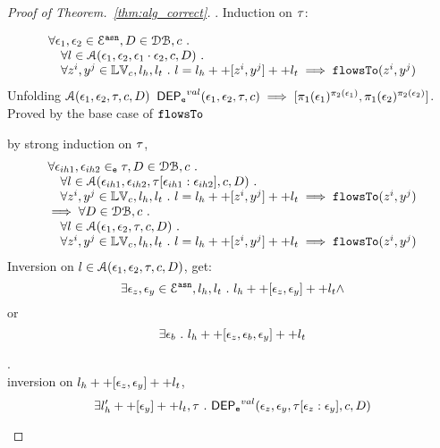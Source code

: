  \begin{proof}[Proof of Theorem.~\ref{thm:alg_correct}].
Induction on $\mathtt{\tau}$:
\begin{case}
[$\trace = \event_1 \cdot \event_2$]
\[
\begin{array}{l}
  \forall \mathtt{\epsilon}_1, \mathtt{\epsilon}_2 \in \mathcal{E}^{\mathtt{{asn}}}, D \in \mathcal{DB} , c ~.~
  \\ \quad 
   \forall l \in \mathcal{A}( \mathtt{\epsilon}_1, \mathtt{\epsilon}_2,  \mathtt{\epsilon}_1 \cdot \mathtt{\epsilon}_2, c, D) ~.~
   \\ \quad 
   \forall z^i, y^j \in \mathbb{LV}_c, l_h, l_t ~.~ 
   l = l_h ++ [z^i, y^j] ++ l_t 
   \implies \mathtt{flowsTo}(z^i, y^j)
\end{array}
\]
%
Unfolding $\mathcal{A}(\mathtt{\epsilon}_1, \mathtt{\epsilon}_2, \mathtt{\tau}, c, D)$
$\mathsf{DEP_{\mathtt{e}}}^{val}(\mathtt{\epsilon}_1, \mathtt{\epsilon}_2, \mathtt{\tau}, c) \implies [\pi_1(\mathtt{\epsilon}_1)^{\pi_2(\mathtt{\epsilon}_1)}, \pi_1(\mathtt{\epsilon}_2)^{\pi_2(\mathtt{\epsilon}_2)}]$.
\\
Proved by the base case of $\mathtt{flowsTo}$
\end{case}
%
\begin{case}
[$\trace = \event_1 \tracecat \trace_{ih} \cdot \event_2$]
by strong induction on $\mathtt{\tau}$,
\[
\begin{array}{l}
  \forall \mathtt{\epsilon}_{ih1}, \mathtt{\epsilon}_{ih2} \in_{\mathtt{e}} \mathtt{\tau}, D \in \mathcal{DB} , c ~.~
  \\ \quad 
   \forall l \in \mathcal{A}(\mathtt{\epsilon}_{ih1}, \mathtt{\epsilon}_{ih2}, \mathtt{\tau}[\mathtt{\epsilon}_{ih1}:\mathtt{\epsilon}_{ih2}], c, D) ~.~
   \\ \quad 
   \forall z^i, y^j \in \mathbb{LV}_c, l_h, l_t ~.~ 
   l = l_h ++ [z^i, y^j] ++ l_t 
   \implies \mathtt{flowsTo}(z^i, y^j)
   \\
   \implies
   \forall D \in \mathcal{DB} , c ~.~
  \\ \quad 
   \forall l \in \mathcal{A}(\mathtt{\epsilon}_1, \mathtt{\epsilon}_2, \mathtt{\tau}, c, D) ~.~
   \\ \quad 
   \forall z^i, y^j \in \mathbb{LV}_c, l_h, l_t ~.~ 
   l = l_h ++ [z^i, y^j] ++ l_t 
   \implies \mathtt{flowsTo}(z^i, y^j)  
\end{array}
\]
%
Inversion on $l \in \mathcal{A}(\mathtt{\epsilon}_1, \mathtt{\epsilon}_2, \mathtt{\tau}, c, D)$, get:
\[
  \exists \mathtt{\epsilon}_z, \mathtt{\epsilon}_y \in \mathcal{E}^{\mathtt{{asn}}}, l_h, l_t 
  ~.~ l_h ++ [\mathtt{\epsilon}_z, \mathtt{\epsilon}_y] ++ l_t \land 
\]
or
\[
    \exists \mathtt{\epsilon}_b ~.~ l_h ++ [\mathtt{\epsilon}_z, \mathtt{\epsilon}_b, \mathtt{\epsilon}_y] ++ l_t
\]
\begin{subcase}.
\\
inversion on  $l_h ++ {[\mathtt{\epsilon}_z, \mathtt{\epsilon}_y]} ++ l_t$, 
\[
  \exists l_{h}' ++ [\mathtt{\epsilon}_y] ++ l_t, \mathtt{\tau} ~.~
  \mathsf{DEP_{\mathtt{e}}}^{val}(\mathtt{\epsilon}_z, \mathtt{\epsilon}_y, \mathtt{\tau}[\mathtt{\epsilon}_z: \mathtt{\epsilon}_y], c, D)
\]
\end{subcase}
\end{case}
\end{proof}
